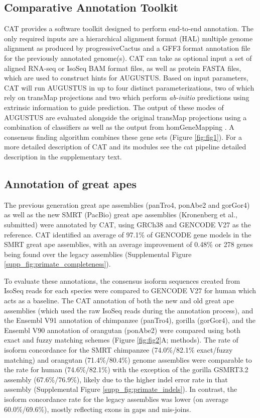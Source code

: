 \documentclass[fleqn,10pt]{wlscirep}
\begin{document}
\subsection{Comparative Annotation Toolkit}
CAT provides a software toolkit designed to perform end-to-end annotation. The only required inputs are a hierarchical alignment format (HAL) \cite{hickey2013hal} multiple genome alignment as produced by progressiveCactus and a GFF3 format annotation file for the previously annotated genome(s). CAT can take as optional input a set of aligned RNA-seq or IsoSeq BAM format files, as well as protein FASTA files, which are used to construct hints for AUGUSTUS. Based on input parameters, CAT will run AUGUSTUS in up to four distinct parameterizations, two of which rely on transMap projections and two which perform \textit{ab-initio} predictions using extrinsic information to guide prediction. The output of these modes of AUGUSTUS are evaluated alongside the original transMap projections using a combination of classifiers as well as the output from homGeneMapping \cite{stanke2004augustus}. A consensus finding algorithm combines these gene sets (Figure \ref{fig:fig1}). For a more detailed description of CAT and its modules see the cat pipeline detailed description in the supplementary text.

\subsection{Annotation of great apes}
The previous generation great ape assemblies (panTro4, ponAbe2 and gorGor4) as well as the new SMRT (PacBio) great ape assemblies \cite{gordon2016long} (Kronenberg et al., submitted) were annotated by CAT, using GRCh38  and GENCODE V27 as the reference. CAT identified an average of 97.1\% of GENCODE gene models in the SMRT great ape assemblies, with an average improvement of 0.48\% or 278 genes being found over the legacy assemblies  (Supplemental Figure \ref{supp_fig:primate_completeness}).

To evaluate these annotations, the consensus isoform sequences created from IsoSeq reads for each species were compared to GENCODE V27 for human which acts as a baseline. The CAT annotation of both the new and old great ape assemblies (which used the raw IsoSeq reads during the annotation process), and the Ensembl V91 annotation of chimpanzee (panTro4), gorilla (gorGor4), and the Ensembl V90 annotation of orangutan (ponAbe2) were compared using both exact and fuzzy matching schemes (Figure \ref{fig:fig2}A; methods). The rate of isoform concordance for the SMRT chimpanzee (74.0\%/82.1\% exact/fuzzy matching) and orangutan (71.4\%/80.4\%) genome assemblies were comparable to the rate for human (74.6\%/82.1\%) with the exception of the gorilla GSMRT3.2 assembly (67.6\%/76.9\%), likely due to the higher indel error rate in that assembly (Supplemental Figure \ref{supp_fig:primate_indels}). In contrast, the isoform concordance rate for the legacy assemblies was lower (on average 60.0\%/69.6\%), mostly reflecting exons in gaps and mis-joins.
\end{document}
